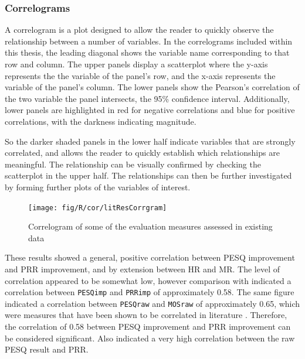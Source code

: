 \begin{minipage}[t]{1\columnwidth}%
\begin{shaded}%

\subsubsection*{Correlograms}

A correlogram is a plot designed to allow the reader to quickly observe
the relationship between a number of variables. In the correlograms
included within this thesis, the leading diagonal shows the variable
name corresponding to that row and column. The upper panels display
a scatterplot where the y-axis represents the the variable of the
panel's row, and the x-axis represents the variable of the panel's
column. The lower panels show the Pearson's correlation of the two
variable the panel intersects, the 95\% confidence interval. Additionally,
lower panels are highlighted in red for negative correlations and
blue for positive correlations, with the darkness indicating magnitude.

So the darker shaded panels in the lower half indicate variables that
are strongly correlated, and allows the reader to quickly establish
which relationships are meaningful. The relationship can be visually
confirmed by checking the scatterplot in the upper half. The relationships
can then be further investigated by forming further plots of the variables
of interest.\end{shaded}%
\end{minipage}

\begin{figure}[H]
\noindent \begin{centering}
\texttt{[image: fig/R/cor/litResCorrgram]}
\par\end{centering}

\protect\caption{\label{fig:litResCorr}Correlogram of some of the evaluation measures
assessed in existing data}
\end{figure}


These results showed a general, positive correlation between \ac{PESQ}
improvement and \ac{PRR} improvement, and by extension between \ac{HR}
and \ac{MR}. The level of correlation appeared to be somewhat low,
however comparison with  indicated a correlation
between \lstinline!PESQimp! and \lstinline!PRRimp! of approximately
0.58. The same figure indicated a correlation between \lstinline!PESQraw!
and \lstinline!MOSraw! of approximately 0.65, which were measures
that have been shown to be correlated in literature \citep{Kitawaki2007,Rix2003,Rix2001}.
Therefore, the correlation of 0.58 between \ac{PESQ} improvement
and \ac{PRR} improvement can be considered significant. 
Also indicated a very high correlation between the raw \ac{PESQ}
result and \ac{PRR}.

